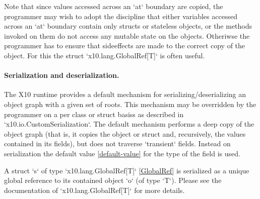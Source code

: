 Note that since values accessed across an \xcd`at` boundary are
copied, the programmer may wish to adopt the discipline that either
variables accessed across an \xcd`at` boundary  contain only structs 
or stateless objects, or the methods invoked on them do not access any
mutable state on the objects. Otheriwse the programmer has to ensure
that sideeffects are made to the correct copy of the object. For this
the struct \xcd`x10.lang.GlobalRef[T]` is often useful.

\paragraph{Serialization and deserialization.}
The X10 runtime provides a default mechanism for
serializing/deserializing an object graph with a given set of roots.
This mechanism may be overridden by the programmer on a per class or
struct basiss as described in \xcd`x10.io.CustomSerialization`. 
The default mechanism performs a
deep copy of the object graph (that is, it copies the object or struct
and, recursively, the values contained in its fields), but does not
traverse \xcd`transient` fields. Instead on serialization the default
value \ref{default-value} for the type of the field is used.

A struct \xcd`s` of type \xcd`x10.lang.GlobalRef[T]` \ref{GlobalRef}
is serialized as a unique global reference to its contained object
\xcd`o` (of type \xcd`T`).  Please see the documentation
of \xcd`x10.lang.GlobalRef[T]` for more details.



